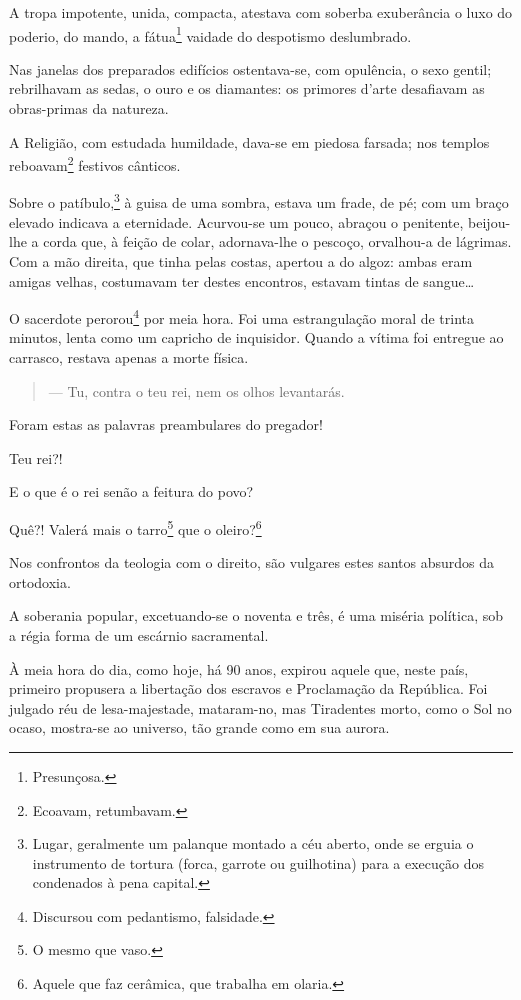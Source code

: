 A tropa impotente, unida, compacta, atestava com soberba exuberância o
luxo do poderio, do mando, a fátua\footnote{Presunçosa.} vaidade do
despotismo deslumbrado.

Nas janelas dos preparados edifícios ostentava-se, com opulência, o sexo
gentil; rebrilhavam as sedas, o ouro e os diamantes: os primores d'arte
desafiavam as obras-primas da natureza.

A Religião, com estudada humildade, dava-se em piedosa farsada; nos
templos reboavam\footnote{Ecoavam, retumbavam.} festivos cânticos.

Sobre o patíbulo,\footnote{Lugar, geralmente um palanque montado a céu
  aberto, onde se erguia o instrumento de tortura (forca, garrote ou
  guilhotina) para a execução dos condenados à pena capital.} à guisa
de uma sombra, estava um frade, de pé; com um braço elevado indicava a
eternidade. Acurvou-se um pouco, abraçou o penitente, beijou-lhe a corda
que, à feição de colar, adornava-lhe o pescoço, orvalhou-a de lágrimas.
Com a mão direita, que tinha pelas costas, apertou a do algoz: ambas
eram amigas velhas, costumavam ter destes encontros, estavam tintas de
sangue\ldots{}

O sacerdote perorou\footnote{Discursou com pedantismo, falsidade.} por
meia hora. Foi uma estrangulação moral de trinta minutos, lenta como um
capricho de inquisidor. Quando a vítima foi entregue ao carrasco,
restava apenas a morte física.

\begin{quote}
--- Tu, contra o teu rei, nem os olhos levantarás.
\end{quote}

Foram estas as palavras preambulares do pregador!

Teu rei?!

E o que é o rei senão a feitura do povo?

Quê?! Valerá mais o tarro\footnote{O mesmo que vaso.} que o
oleiro?\footnote{Aquele que faz cerâmica, que trabalha em olaria.}

Nos confrontos da teologia com o direito, são vulgares estes santos
absurdos da ortodoxia.

A soberania popular, excetuando-se o noventa e três, é uma miséria
política, sob a régia forma de um escárnio sacramental.

\noindent\dotfill{}

À meia hora do dia, como hoje, há 90 anos, expirou aquele que, neste
país, primeiro propusera a libertação dos escravos e Proclamação da
República. Foi julgado réu de lesa-majestade, mataram-no, mas Tiradentes
morto, como o Sol no ocaso, mostra-se ao universo, tão grande como em
sua aurora.

